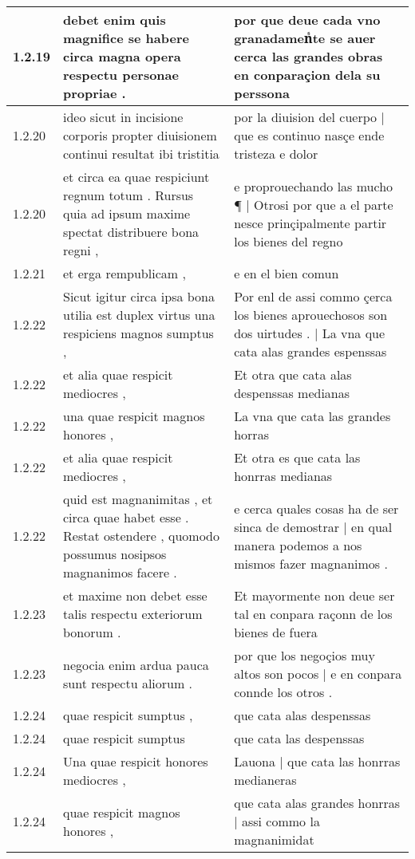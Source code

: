 \begin{tabular}{|p{1cm}|p{6.5cm}|p{6.5cm}|}
1.2.19 & debet enim quis magnifice se habere circa magna opera respectu personae propriae . & por que deue cada vno granadamenᷤte se auer cerca las grandes obras en conparaçion dela su perssona \\\hline
1.2.20 & ideo sicut in incisione corporis propter diuisionem continui resultat ibi tristitia & por la diuision del cuerpo | que es continuo nasçe ende tristeza e dolor \\\hline
1.2.20 & et circa ea quae respiciunt regnum totum . Rursus quia ad ipsum maxime spectat distribuere bona regni , & e proprouechando las mucho ¶ | Otrosi por que a el parte nesce prinçipalmente partir los bienes del regno \\\hline
1.2.21 & et erga rempublicam , & e en el bien comun \\\hline
1.2.22 & Sicut igitur circa ipsa bona utilia est duplex virtus una respiciens magnos sumptus , & Por enl de assi commo çerca los bienes aprouechosos son dos uirtudes . | La vna que cata alas grandes espenssas \\\hline
1.2.22 & et alia quae respicit mediocres , & Et otra que cata alas despenssas medianas \\\hline
1.2.22 & una quae respicit magnos honores , & La vna que cata las grandes horras \\\hline
1.2.22 & et alia quae respicit mediocres , & Et otra es que cata las honrras medianas \\\hline
1.2.22 & quid est magnanimitas , et circa quae habet esse . Restat ostendere , quomodo possumus nosipsos magnanimos facere . & e cerca quales cosas ha de ser sinca de demostrar | en qual manera podemos a nos mismos fazer magnanimos . \\\hline
1.2.23 & et maxime non debet esse talis respectu exteriorum bonorum . & Et mayormente non deue ser tal en conpara raçonn de los bienes de fuera \\\hline
1.2.23 & negocia enim ardua pauca sunt respectu aliorum . & por que los negoçios muy altos son pocos | e en conpara connde los otros . \\\hline
1.2.24 & quae respicit sumptus , & que cata alas despenssas \\\hline
1.2.24 & quae respicit sumptus & que cata las despenssas \\\hline
1.2.24 & Una quae respicit honores mediocres , & Lauona | que cata las honrras medianeras \\\hline
1.2.24 & quae respicit magnos honores , & que cata alas grandes honrras | assi commo la magnanimidat \\\hline

\end{tabular}
